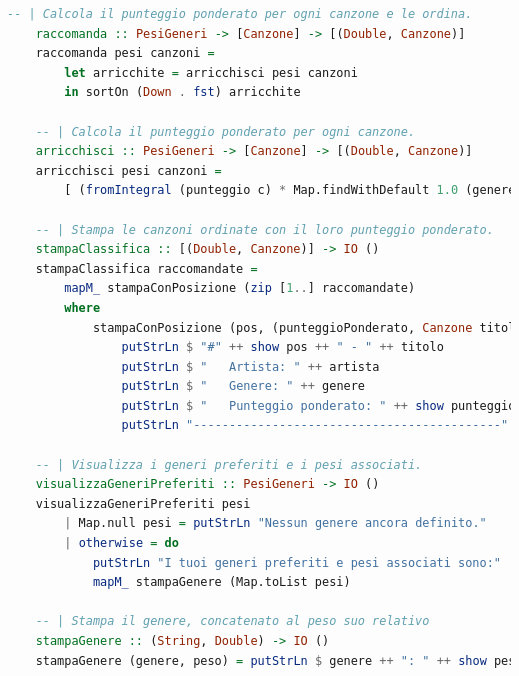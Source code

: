 \documentclass[a4paper,11pt]{article}
\begin{document}
\begin{lstlisting}[language=Haskell]
    -- | Calcola il punteggio ponderato per ogni canzone e le ordina.
    raccomanda :: PesiGeneri -> [Canzone] -> [(Double, Canzone)]
    raccomanda pesi canzoni =
        let arricchite = arricchisci pesi canzoni
        in sortOn (Down . fst) arricchite
    
    -- | Calcola il punteggio ponderato per ogni canzone.
    arricchisci :: PesiGeneri -> [Canzone] -> [(Double, Canzone)]
    arricchisci pesi canzoni =
        [ (fromIntegral (punteggio c) * Map.findWithDefault 1.0 (genere c) pesi, c) | c <- canzoni ]
    
    -- | Stampa le canzoni ordinate con il loro punteggio ponderato.
    stampaClassifica :: [(Double, Canzone)] -> IO ()
    stampaClassifica raccomandate =
        mapM_ stampaConPosizione (zip [1..] raccomandate)
        where
            stampaConPosizione (pos, (punteggioPonderato, Canzone titolo artista genere _)) = do
                putStrLn $ "#" ++ show pos ++ " - " ++ titolo
                putStrLn $ "   Artista: " ++ artista
                putStrLn $ "   Genere: " ++ genere
                putStrLn $ "   Punteggio ponderato: " ++ show punteggioPonderato
                putStrLn "-------------------------------------------"
    
    -- | Visualizza i generi preferiti e i pesi associati.
    visualizzaGeneriPreferiti :: PesiGeneri -> IO ()
    visualizzaGeneriPreferiti pesi
        | Map.null pesi = putStrLn "Nessun genere ancora definito."
        | otherwise = do
            putStrLn "I tuoi generi preferiti e pesi associati sono:"
            mapM_ stampaGenere (Map.toList pesi)
    
    -- | Stampa il genere, concatenato al peso suo relativo
    stampaGenere :: (String, Double) -> IO ()
    stampaGenere (genere, peso) = putStrLn $ genere ++ ": " ++ show peso
\end{lstlisting}

\newpage
\end{document}
